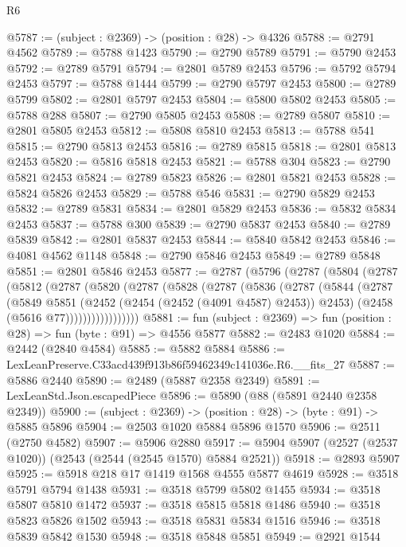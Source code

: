 \begin{lexlean}{R6}
\begin{coremodule}
@5787 := (subject : @2369) -> (position : @28) -> @4326
@5788 := @2791 @4562
@5789 := @5788 @1423
@5790 := @2790 @5789
@5791 := @5790 @2453
@5792 := @2789 @5791
@5794 := @2801 @5789 @2453
@5796 := @5792 @5794 @2453
@5797 := @5788 @1444
@5799 := @2790 @5797 @2453
@5800 := @2789 @5799
@5802 := @2801 @5797 @2453
@5804 := @5800 @5802 @2453
@5805 := @5788 @288
@5807 := @2790 @5805 @2453
@5808 := @2789 @5807
@5810 := @2801 @5805 @2453
@5812 := @5808 @5810 @2453
@5813 := @5788 @541
@5815 := @2790 @5813 @2453
@5816 := @2789 @5815
@5818 := @2801 @5813 @2453
@5820 := @5816 @5818 @2453
@5821 := @5788 @304
@5823 := @2790 @5821 @2453
@5824 := @2789 @5823
@5826 := @2801 @5821 @2453
@5828 := @5824 @5826 @2453
@5829 := @5788 @546
@5831 := @2790 @5829 @2453
@5832 := @2789 @5831
@5834 := @2801 @5829 @2453
@5836 := @5832 @5834 @2453
@5837 := @5788 @300
@5839 := @2790 @5837 @2453
@5840 := @2789 @5839
@5842 := @2801 @5837 @2453
@5844 := @5840 @5842 @2453
@5846 := @4081 @4562 @1148
@5848 := @2790 @5846 @2453
@5849 := @2789 @5848
@5851 := @2801 @5846 @2453
@5877 := @2787
    (@5796
      (@2787
        (@5804
          (@2787
            (@5812
              (@2787
                (@5820
                  (@2787
                    (@5828
                      (@2787
                        (@5836
                          (@2787
                            (@5844
                              (@2787
                                (@5849
                                  @5851
                                  (@2452 (@2454 (@2452 (@4091 @4587) @2453)) @2453)
                                  (@2458 (@5616 @77)))))))))))))))))
@5881 := fun (subject : @2369) => fun (position : @28) => fun (byte : @91) => @4556 @5877
@5882 := @2483 @1020
@5884 := @2442 (@2840 @4584)
@5885 := @5882 @5884
@5886 := LexLeanPreserve.C33acd439f913b86f59462349c141036e.R6.__fits_27
@5887 := @5886 @2440
@5890 := @2489 (@5887 @2358 @2349)
@5891 := LexLeanStd.Json.escapedPiece
@5896 := @5890 (@88 (@5891 @2440 @2358 @2349))
@5900 := (subject : @2369) -> (position : @28) -> (byte : @91) -> @5885 @5896
@5904 := @2503 @1020 @5884 @5896 @1570
@5906 := @2511 (@2750 @4582)
@5907 := @5906 @2880
@5917 := @5904 @5907 (@2527 (@2537 @1020)) (@2543 (@2544 (@2545 @1570) @5884 @2521))
@5918 := @2893 @5907
@5925 := @5918 @218 @17 @1419 @1568 @4555 @5877 @4619
@5928 := @3518 @5791 @5794 @1438
@5931 := @3518 @5799 @5802 @1455
@5934 := @3518 @5807 @5810 @1472
@5937 := @3518 @5815 @5818 @1486
@5940 := @3518 @5823 @5826 @1502
@5943 := @3518 @5831 @5834 @1516
@5946 := @3518 @5839 @5842 @1530
@5948 := @3518 @5848 @5851
@5949 := @2921 @1544

\end{coremodule}
\end{lexlean}
